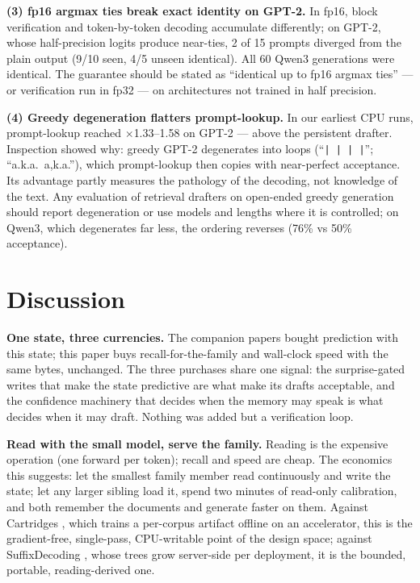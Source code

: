 \documentclass[11pt]{article}
\begin{document}
\textbf{(3) fp16 argmax ties break exact identity on GPT-2.} In fp16, block verification and token-by-token decoding accumulate differently; on GPT-2, whose half-precision logits produce near-ties, 2 of 15 prompts diverged from the plain output (9/10 seen, 4/5 unseen identical). All 60 Qwen3 generations were identical. The guarantee should be stated as ``identical up to fp16 argmax ties'' --- or verification run in fp32 --- on architectures not trained in half precision.

\textbf{(4) Greedy degeneration flatters prompt-lookup.} In our earliest CPU runs, prompt-lookup reached $\times$1.33--1.58 on GPT-2 --- above the persistent drafter. Inspection showed why: greedy GPT-2 degenerates into loops (``\texttt{| | | |}''; ``a.k.a.\ a,k.a.''), which prompt-lookup then copies with near-perfect acceptance. Its advantage partly measures the pathology of the decoding, not knowledge of the text. Any evaluation of retrieval drafters on open-ended greedy generation should report degeneration or use models and lengths where it is controlled; on Qwen3, which degenerates far less, the ordering reverses (76\% vs 50\% acceptance).

\section{Discussion}

\textbf{One state, three currencies.} The companion papers bought prediction with this state; this paper buys recall-for-the-family and wall-clock speed with the same bytes, unchanged. The three purchases share one signal: the surprise-gated writes that make the state predictive are what make its drafts acceptable, and the confidence machinery that decides when the memory may speak is what decides when it may draft. Nothing was added but a verification loop.

\textbf{Read with the small model, serve the family.} Reading is the expensive operation (one forward per token); recall and speed are cheap. The economics this suggests: let the smallest family member read continuously and write the state; let any larger sibling load it, spend two minutes of read-only calibration, and both remember the documents and generate faster on them. Against Cartridges \cite{cartridges}, which trains a per-corpus artifact offline on an accelerator, this is the gradient-free, single-pass, CPU-writable point of the design space; against SuffixDecoding \cite{suffix}, whose trees grow server-side per deployment, it is the bounded, portable, reading-derived one.
\end{document}
